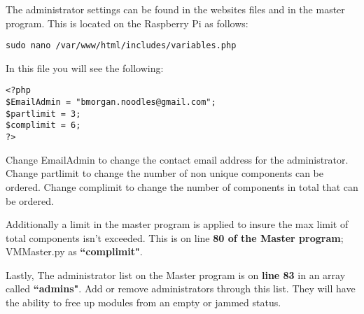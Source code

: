 \documentclass[a4paper,11pt]{article}
\numberwithin{figure}{section}
\numberwithin{table}{section}
\begin{document}
\begin{appendices}
The administrator settings can be found in the websites files and in the master program. This is located on the Raspberry Pi as follows:
\begin{lstlisting}
sudo nano /var/www/html/includes/variables.php
\end{lstlisting}
In this file you will see the following:
\begin{lstlisting}
<?php
$EmailAdmin = "bmorgan.noodles@gmail.com";
$partlimit = 3;
$complimit = 6;
?>
\end{lstlisting}
Change EmailAdmin to change the contact email address for the administrator. Change partlimit to change the number of non unique components can be ordered. Change complimit to change the number of components in total that can be ordered.

Additionally a limit in the master program is applied to insure the max limit of total components isn't exceeded. This is on line \textbf{80 of the Master program}; VMMaster.py as \textbf{``complimit"}.

Lastly, The administrator list on the Master program is on \textbf{line 83} in an array called \textbf{``admins"}. Add or remove administrators through this list. They will have the ability to free up modules from an empty or jammed status.



\end{appendices}
\end{document}
